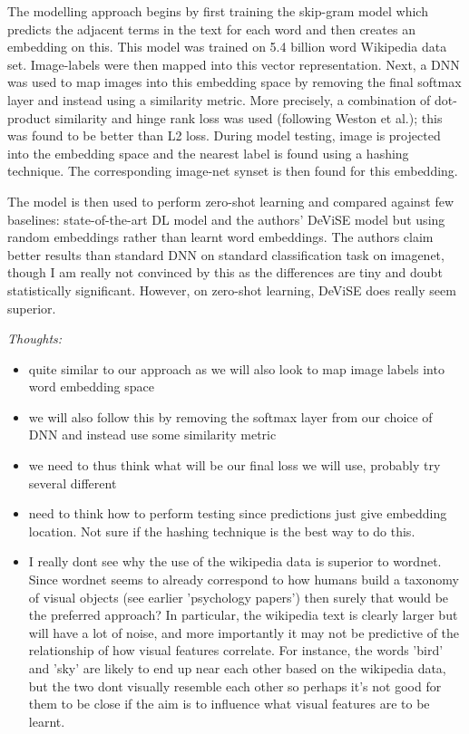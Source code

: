 \documentclass{report}
\begin{document}
The modelling approach begins by first training the skip-gram model which predicts the adjacent terms in the text for each word and then creates an embedding on this. This model was trained on 5.4 billion word Wikipedia data set. Image-labels were then mapped into this vector representation. Next, a DNN was used to map images into this embedding space by removing the final softmax layer and instead using a similarity metric. More precisely, a combination of dot-product similarity and hinge rank loss was used (following Weston et al.); this was found to be better than L2 loss. During model testing, image is projected into the embedding space and the nearest label is found using a hashing technique. The corresponding image-net synset is then found for this embedding.

The model is then used to perform zero-shot learning and compared against few baselines: state-of-the-art DL model and the authors' DeViSE model but using random embeddings rather than learnt word embeddings. The authors claim better results than standard DNN on standard classification task on imagenet, though I am really not convinced by this as the differences are tiny and doubt statistically significant. However, on zero-shot learning, DeViSE does really seem superior. 

\textit{Thoughts:}

\begin{itemize}
\item quite similar to our approach as we will also look to map image labels into word embedding space 
\item we will also follow this by removing the softmax layer from our choice of DNN and instead use some similarity metric
\item we need to thus think what will be our final loss we will use, probably try several different
\item need to think how to perform testing since predictions just give embedding location. Not sure if the hashing technique is the best way to do this. 
\item I really dont see why the use of the wikipedia data is superior to wordnet. Since wordnet seems to already correspond to how humans build a taxonomy of visual objects (see earlier 'psychology papers') then surely that would be the preferred approach? In particular, the wikipedia text is clearly larger but will have a lot of noise, and more importantly it may not be predictive of the relationship of how visual features correlate. For instance, the words 'bird' and 'sky' are likely to end up near each other based on the wikipedia data, but the two dont visually resemble each other so perhaps it's not good for them to be close if the aim is to influence what visual features are to be learnt.
\end{itemize}
\end{document}
